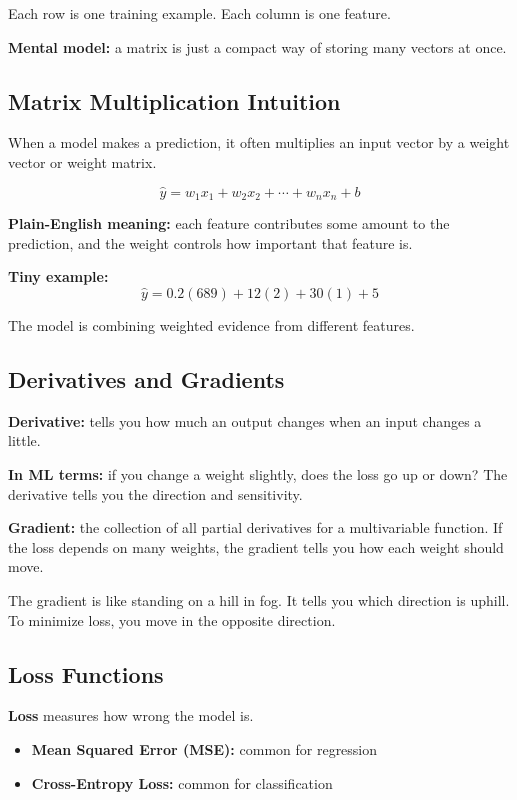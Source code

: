 \documentclass[12pt, a4paper, oneside]{book}
\begin{document}
Each row is one training example. Each column is one feature.

\textbf{Mental model:} a matrix is just a compact way of storing many vectors at once.

\subsection{Matrix Multiplication Intuition}

When a model makes a prediction, it often multiplies an input vector by a weight vector or weight matrix.

\[
\hat{y} = w_1x_1 + w_2x_2 + \cdots + w_nx_n + b
\]

\textbf{Plain-English meaning:} each feature contributes some amount to the prediction, and the weight controls how important that feature is.

\textbf{Tiny example:}
\[
\hat{y} = 0.2(689) + 12(2) + 30(1) + 5
\]

The model is combining weighted evidence from different features.

\subsection{Derivatives and Gradients}

\textbf{Derivative:} tells you how much an output changes when an input changes a little.

\textbf{In ML terms:} if you change a weight slightly, does the loss go up or down? The derivative tells you the direction and sensitivity.

\textbf{Gradient:} the collection of all partial derivatives for a multivariable function. If the loss depends on many weights, the gradient tells you how each weight should move.

\begin{intuitionbox}
The gradient is like standing on a hill in fog. It tells you which direction is uphill. To minimize loss, you move in the opposite direction.
\end{intuitionbox}

\subsection{Loss Functions}

\textbf{Loss} measures how wrong the model is.

\begin{itemize}[leftmargin=2em]
    \item \textbf{Mean Squared Error (MSE):} common for regression
    \item \textbf{Cross-Entropy Loss:} common for classification
\end{itemize}
\end{document}
